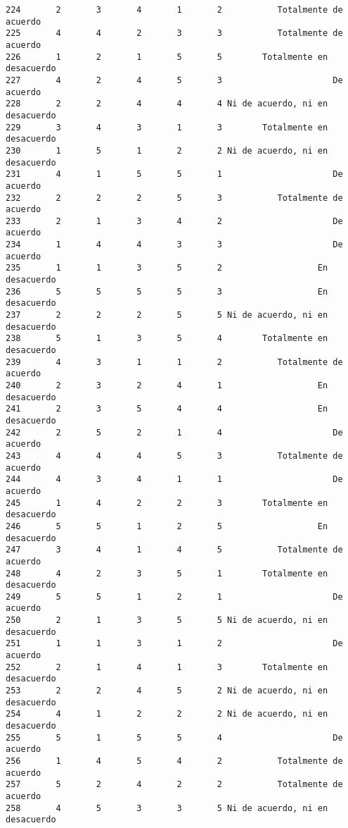 \documentclass[
  letterpaper,
  DIV=11,
  numbers=noendperiod]{scrartcl}
\begin{document}
\begin{verbatim}
224       2       3       4       1       2           Totalmente de acuerdo
225       4       4       2       3       3           Totalmente de acuerdo
226       1       2       1       5       5        Totalmente en desacuerdo
227       4       2       4       5       3                      De acuerdo
228       2       2       4       4       4 Ni de acuerdo, ni en desacuerdo
229       3       4       3       1       3        Totalmente en desacuerdo
230       1       5       1       2       2 Ni de acuerdo, ni en desacuerdo
231       4       1       5       5       1                      De acuerdo
232       2       2       2       5       3           Totalmente de acuerdo
233       2       1       3       4       2                      De acuerdo
234       1       4       4       3       3                      De acuerdo
235       1       1       3       5       2                   En desacuerdo
236       5       5       5       5       3                   En desacuerdo
237       2       2       2       5       5 Ni de acuerdo, ni en desacuerdo
238       5       1       3       5       4        Totalmente en desacuerdo
239       4       3       1       1       2           Totalmente de acuerdo
240       2       3       2       4       1                   En desacuerdo
241       2       3       5       4       4                   En desacuerdo
242       2       5       2       1       4                      De acuerdo
243       4       4       4       5       3           Totalmente de acuerdo
244       4       3       4       1       1                      De acuerdo
245       1       4       2       2       3        Totalmente en desacuerdo
246       5       5       1       2       5                   En desacuerdo
247       3       4       1       4       5           Totalmente de acuerdo
248       4       2       3       5       1        Totalmente en desacuerdo
249       5       5       1       2       1                      De acuerdo
250       2       1       3       5       5 Ni de acuerdo, ni en desacuerdo
251       1       1       3       1       2                      De acuerdo
252       2       1       4       1       3        Totalmente en desacuerdo
253       2       2       4       5       2 Ni de acuerdo, ni en desacuerdo
254       4       1       2       2       2 Ni de acuerdo, ni en desacuerdo
255       5       1       5       5       4                      De acuerdo
256       1       4       5       4       2           Totalmente de acuerdo
257       5       2       4       2       2           Totalmente de acuerdo
258       4       5       3       3       5 Ni de acuerdo, ni en desacuerdo

\end{verbatim}
\end{document}
